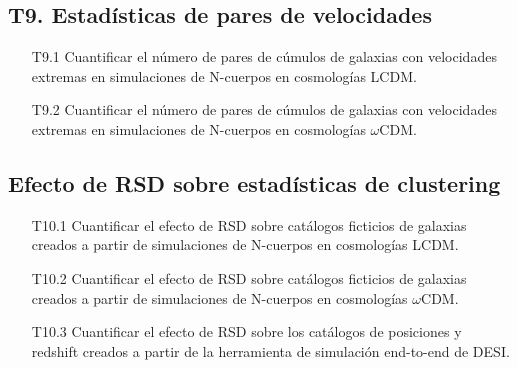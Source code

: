 \subsection*{T9. Estad\'isticas de pares de velocidades}
\begin{itemize}
\item[T9.1] Cuantificar el n\'umero de pares de c\'umulos de galaxias
  con velocidades extremas en simulaciones de N-cuerpos en
  cosmolog\'ias LCDM.
\item[T9.2] Cuantificar el n\'umero de pares de c\'umulos de galaxias
  con velocidades extremas en simulaciones de N-cuerpos en
  cosmolog\'ias $\omega$CDM.
\end{itemize}

\subsection*{Efecto de RSD sobre estad\'isticas de clustering}
\begin{itemize}
\item[T10.1] 
Cuantificar el efecto de RSD sobre cat\'alogos ficticios de
  galaxias creados a partir de simulaciones de N-cuerpos en
  cosmolog\'ias LCDM.
\item[T10.2] Cuantificar el efecto de RSD sobre cat\'alogos ficticios de
  galaxias creados a partir de simulaciones de N-cuerpos en
  cosmolog\'ias $\omega$CDM.
\item[T10.3] Cuantificar el efecto de RSD sobre los cat\'alogos de
  posiciones y redshift creados a partir de la herramienta de
  simulaci\'on end-to-end de DESI.
\end{itemize}



